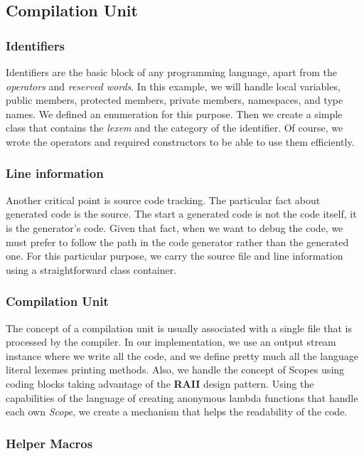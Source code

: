 \documentclass{article}
\begin{document}
\subsection{Compilation Unit}

\subsubsection{Identifiers}

Identifiers are the basic block of any programming language, apart from the \textit{operators} and \textit{reserved words}. In this example, we will handle local variables, public members, protected members,  private members, namespaces, and type names. We defined an enumeration for this purpose. Then we create a simple class that contains the \textit{lexem} and the category of the identifier. Of course, we wrote the operators and required constructors to be able to use them efficiently.

\subsubsection{Line information}

Another critical point is source code tracking. The particular fact about generated code is the source. The start a generated code is not the code itself, it is the generator's code. Given that fact, when we want to debug the code, we must prefer to follow the path in the code generator rather than the generated one. For this particular purpose, we carry the source file and line information using a straightforward class container.

\subsubsection{Compilation Unit}

The concept of a compilation unit is usually associated with a  single file that is processed by the compiler. In our implementation, we use an output stream instance where we write all the code, and we define pretty much all the language literal lexemes printing methods. Also, we handle the concept of Scopes using coding blocks taking advantage of the \textbf{RAII} design pattern. Using the capabilities of the language of creating anonymous lambda functions that handle each own \textit{Scope}, we create a mechanism that helps the readability of the code.

\subsubsection{Helper Macros}
\end{document}
